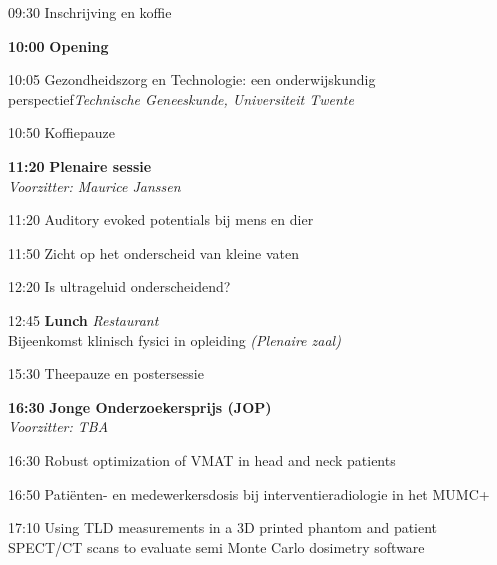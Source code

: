 \documentclass[a4paper,10pt]{report}
\begin{document}
\begin{multicols*}{3}
\begin{packed_enum}
    \item[09:30] Inschrijving en koffie
        \vfill
    \item[\textbf{10:00}] \textbf{Opening}
        \vfill
    \item[10:05] Gezondheidszorg en Technologie: een onderwijskundig perspectief\hfill {\small \textit{Technische Geneeskunde, Universiteit Twente}}
        \vfill
    \item[10:50] Koffiepauze
        \vfill
    \item[\textbf{11:20}] {\textbf{Plenaire sessie}}\\\textit{Voorzitter: Maurice Janssen}
        \item[11:20] Auditory evoked potentials bij mens en dier
        \item[11:50] Zicht op het onderscheid van kleine vaten
        \item[12:20] Is ultrageluid onderscheidend?
        \vfill
    \item[12:45] \textbf{Lunch} \hfill{\small \textit{Restaurant}}\\
        {\small Bijeenkomst klinisch fysici in opleiding \hfill\textit{(Plenaire zaal)}}
        \vfill
    \item[{\color{DarkBlue}{\textbf{14:00}}}]{ }
        \vfill
    \item[15:30] Theepauze en postersessie 
        \vfill
    \item[\textbf{16:30}] {\textbf{Jonge Onderzoekersprijs (JOP)}}\\\textit{Voorzitter: TBA}
    \item[16:30] Robust optimization of VMAT in head and neck patients
    \item[16:50] Patiënten- en medewerkersdosis bij interventieradiologie in het MUMC+
    \item[17:10] Using TLD measurements in a 3D printed phantom and patient SPECT/CT scans to evaluate semi Monte Carlo dosimetry software

\end{packed_enum}
\end{multicols*}
\end{document}
